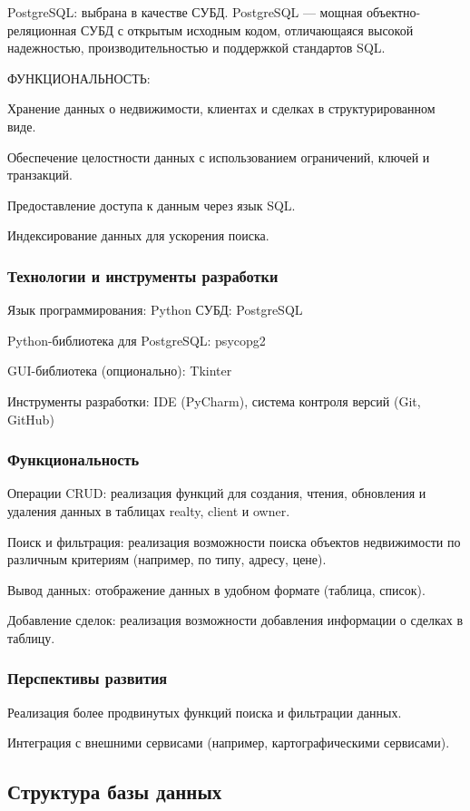 PostgreSQL: выбрана в качестве СУБД. PostgreSQL — мощная объектно-реляционная СУБД с открытым исходным кодом, отличающаяся высокой надежностью, производительностью и поддержкой стандартов SQL.

ФУНКЦИОНАЛЬНОСТЬ:

Хранение данных о недвижимости, клиентах и сделках в структурированном виде.

Обеспечение целостности данных с использованием ограничений, ключей и транзакций.

Предоставление доступа к данным через язык SQL.

Индексирование данных для ускорения поиска.

\subsubsection{Технологии и инструменты разработки}

Язык программирования: Python
СУБД: PostgreSQL

Python-библиотека для PostgreSQL: psycopg2

GUI-библиотека (опционально): Tkinter

Инструменты разработки: IDE (PyCharm), система контроля версий (Git, GitHub)

\subsubsection{Функциональность}

Операции CRUD: реализация функций для создания, чтения, обновления и удаления данных в таблицах realty, client и owner.

Поиск и фильтрация: реализация возможности поиска объектов недвижимости по различным критериям (например, по типу, адресу, цене).

Вывод данных: отображение данных в удобном формате (таблица, список).

Добавление сделок: реализация возможности добавления информации о сделках в таблицу.

\subsubsection{Перспективы развития}

Реализация более продвинутых функций поиска и фильтрации данных.

Интеграция с внешними сервисами (например, картографическими сервисами).

\subsection{Структура базы данных}

